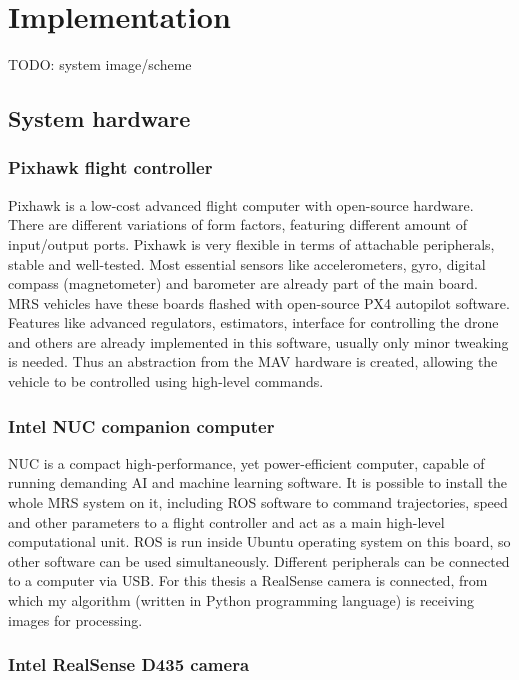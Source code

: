 \chapter{Implementation}

TODO: system image/scheme

\section{System hardware}

\subsection{Pixhawk flight controller}

Pixhawk is a low-cost advanced flight computer with open-source hardware. There are different variations of form factors, featuring different amount of input/output ports. Pixhawk is very flexible in terms of attachable peripherals, stable and well-tested. Most essential sensors like accelerometers, gyro, digital compass (magnetometer) and barometer are already part of the main board. MRS vehicles have these boards flashed with open-source PX4 autopilot software. Features like advanced regulators, estimators, interface for controlling the drone and others are already implemented in this software, usually only minor tweaking is needed. Thus an abstraction from the MAV hardware is created, allowing the vehicle to be controlled using high-level commands.


\subsection{Intel NUC companion computer}

NUC is a compact high-performance, yet power-efficient computer, capable of running demanding AI and machine learning software. It is possible to install the whole MRS system on it, including ROS software to command trajectories, speed and other parameters to a flight controller and act as a main high-level computational unit. ROS is run inside Ubuntu operating system on this board, so other software can be used simultaneously. Different peripherals can be connected to a computer via USB. For this thesis a RealSense camera is connected, from which my algorithm (written in Python programming language) is receiving images for processing.

\subsection{Intel RealSense D435 camera}

